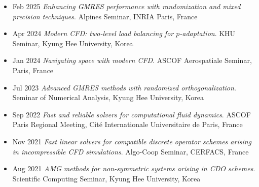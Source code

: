 \documentclass[11pt, a4paper]{article}
\newlength{\datecolwidth}
\newenvironment{cvlist}{%
    \begin{itemize}[
        leftmargin=\datecolwidth,
        labelwidth=\datecolwidth-0.3cm,
        labelsep=0.3cm,
        align=left,
        font=\sffamily\small\color{accent},
        topsep=0pt, partopsep=0pt, parsep=0pt,
        itemsep=0.20cm
    ]
}{\end{itemize}}
\begin{document}
\begin{cvlist}
    \item[Feb 2025] \textit{Enhancing GMRES performance with randomization and mixed precision techniques}. Alpines Seminar, INRIA Paris, France
    \item[Apr 2024] \textit{Modern CFD: two-level load balancing for $p$-adaptation}. KHU Seminar, Kyung Hee University, Korea
    \item[Jan 2024] \textit{Navigating space with modern CFD}. ASCOF Aerospatiale Seminar, Paris, France
    \item[Jul 2023] \textit{Advanced GMRES methods with randomized orthogonalization}. Seminar of Numerical Analysis, Kyung Hee University, Korea
    \item[Sep 2022] \textit{Fast and reliable solvers for computational fluid dynamics}. ASCOF Paris Regional Meeting, Cit\'e Internationale Universitaire de Paris, France
    \item[Nov 2021] \textit{Fast linear solvers for compatible discrete operator schemes arising in incompressible CFD simulations}. Algo-Coop Seminar, CERFACS, France
    \item[Aug 2021] \textit{AMG methods for non-symmetric systems arising in CDO schemes}. Scientific Computing Seminar, Kyung Hee University, Korea
\end{cvlist}
\end{document}
